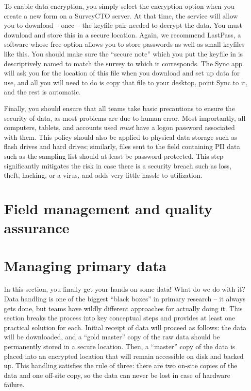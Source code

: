To enable data encryption, you simply select the encryption option
when you create a new form on a SurveyCTO server.
At that time, the service will allow you to download -- once --
the keyfile pair needed to decrypt the data.
You must download and store this in a secure location.
Again, we recommend LastPass, a software whose free option
allows you to store passwords as well as small keyfiles like this.
You should make sure the ``secure note'' which you put the keyfile in
is descriptively named to match the survey to which it corresponds.
The Sync app will ask you for the location of this file
when you download and set up data for use,
and all you will need to do is copy that file to your desktop,
point Sync to it, and the rest is automatic.

Finally, you should ensure that all teams take basic precautions
to ensure the security of data, as most problems are due to human error.
Most importantly, all computers, tablets, and accounts used
\textit{must} have a logon password associated with them.
This policy should also be applied to physical data storage
such as flash drives and hard drives;
similarly, files sent to the field containing PII data
such as the sampling list should at least be password-protected.
This step significantly mitigates the risk in case there is
a security breach such as loss, theft, hacking, or a virus,
and adds very little hassle to utilization.



\section{Field management and quality assurance}


\section{Managing primary data}

In this section, you finally get your hands on some data!
What do we do with it? Data handling is one of the biggest
``black boxes'' in primary research -- it always gets done,
but teams have wildly different approaches for actually doing it.
This section breaks the process into key conceptual steps
and provides at least one practical solution for each.
Initial receipt of data will proceed as follows:
the data will be downloaded, and a ``gold master'' copy
of the raw data should be permanently stored in a secure location.
Then, a ``master'' copy of the data is placed into an encrypted location
that will remain accessible on disk and backed up.
This handling satisfies the rule of three:
there are two on-site copies of the data and one off-site copy,
so the data can never be lost in case of hardware failure.

